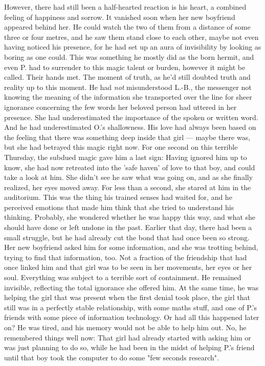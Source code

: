 However, there had still been a half-hearted reaction is his heart, a combined feeling of happiness and sorrow. It vanished soon when her new boyfriend appeared behind her. 
He could watch the two of them from a distance of some three or four metres, and he saw them stand close to each other, maybe not even having noticed his presence, for he had set up an aura of invisibility by looking as boring as one could. This was something he mostly did as the born hermit, and even P. had to surrender to this magic talent or burden, however it might be called. 
Their hands met. The moment of truth, as he'd still doubted truth and reality up to this moment. He had \emph{not} misunderstood L.-B., the messenger not knowing the meaning of the information she transported over the line for sheer ignorance concerning the few words her beloved person had uttered in her presence. She had underestimated the importance of the spoken or written word. 
And he had underestimated O.'s shallowness. 
His love had always been based on the feeling that there was something deep inside that girl --- maybe there was, but she had betrayed this magic right now. For one second on this terrible Thursday, the subdued magic gave him a last sign: Having ignored him up to know, she had now retreated into the 'safe haven' of love to that boy, and could take a look at him. 
She didn't see he saw what was going on, and as she finally realized, her eyes moved away. For less than a second, she stared at him in the auditorium. This was the thing his trained senses had waited for, and he perceived emotions that made him think that she tried to understand his thinking. Probably, she wondered whether he was happy this way, and what she should have done or left undone in the past. 
Earlier that day, there had been a small struggle, but he had already cut the bond that had once been so strong. Her new boyfriend asked him for some information, and she was trotting behind, trying to find that information, too. Not a fraction of the friendship that had once linked him and that girl was to be seen in her movements, her eyes or her soul. Everything was subject to a terrible sort of containment. 
He remained invisible, reflecting the total ignorance she offered him. At the same time, he was helping the girl that was present when the first denial took place, the girl that still was in a perfectly stable relationship, with some maths stuff, and one of P.'s friends with some piece of information technology. Or had all this happened later on? He was tired, and his memory would not be able to help him out. 
No, he remembered things well now: That girl had already started with asking him or was just planning to do so, while he had been in the midst of helping P.'s friend until that boy took the computer to do some "few seconds research". 
